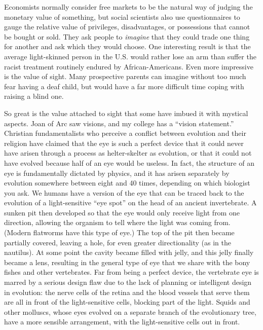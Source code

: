 Economists normally consider free markets to be the natural
way of judging the monetary value of something, but social
scientists also use questionnaires to gauge the relative
value of privileges, disadvantages, or possessions that
cannot be bought or sold. They ask people to \emph{imagine}
that they could trade one thing for another and ask which
they would choose. One interesting result is that the
average light-skinned person in the U.S. would rather lose
an arm than suffer the racist treatment routinely endured by
African-Americans. Even more impressive is the value of
sight. Many prospective parents can imagine without too much
fear having a deaf child, but would have a far more
difficult time coping with raising a blind one.

So great is the value attached to sight that some have
imbued it with mystical aspects. Joan of Arc saw visions,
and my college has a ``vision statement.'' Christian
fundamentalists who perceive a conflict between evolution
and their religion have claimed that the eye is such a
perfect device that it could never have arisen through a
process as helter-skelter as evolution, or that it could not
have evolved because half of an eye
would be useless. In fact, the structure of an eye is
fundamentally dictated by physics, and it has arisen
separately by evolution somewhere between eight and 40
times, depending on which biologist you ask. We humans have
a version of the eye that can be traced back to the
evolution of a light-sensitive ``eye spot'' on the head of
an ancient invertebrate. A sunken pit then developed so that
the eye would only receive light from one direction,
allowing the organism to tell where the light was coming
from. (Modern flatworms have this type of
eye.) The top of the pit then became partially covered,
leaving a hole, for even greater directionality (as in the
nautilus). At some point the cavity became
filled with jelly, and this jelly finally became a lens,
resulting in the general type of eye that we share with the
bony fishes and other vertebrates. Far from being a perfect
device, the vertebrate eye is marred by a serious design
flaw due to the lack of planning or intelligent design in
evolution: the nerve cells of the retina and the blood
vessels that serve them are all in front of the light-sensitive
cells, blocking part of the light. Squids and
other molluscs, whose eyes evolved on a
separate branch of the evolutionary tree, have a more
sensible arrangement, with the light-sensitive cells out in front.


